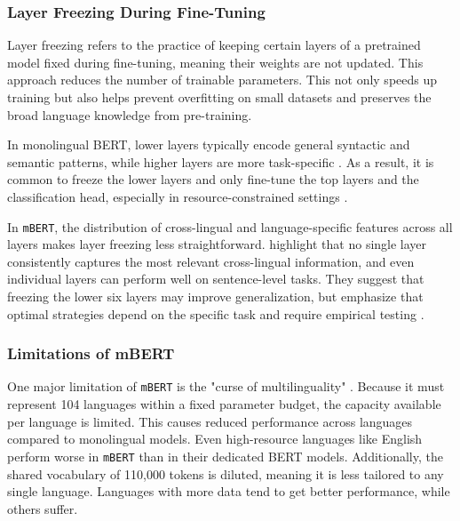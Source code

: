 \subsubsection{Layer Freezing During Fine-Tuning} \label{subsection:layer_freezing}
    Layer freezing refers to the practice of keeping certain layers of a pretrained model fixed during fine-tuning, meaning their weights are not updated. This approach reduces the number of trainable parameters. This not only speeds up training \parencite{sorrentiSelectiveFreezingEfficient2023} but also helps prevent overfitting on small datasets and preserves the broad language knowledge from pre-training.

    In monolingual BERT, lower layers typically encode general syntactic and semantic patterns, while higher layers are more task-specific \parencite{nadipalliLayerWiseEvolutionRepresentations2025}. As a result, it is common to freeze the lower layers and only fine-tune the top layers and the classification head, especially in resource-constrained settings \parencite{nadipalliLayerWiseEvolutionRepresentations2025}.

    In \texttt{mBERT}, the distribution of cross-lingual and language-specific features across all layers makes layer freezing less straightforward. \textcite{wuBetoBentzBecas2019} highlight that no single layer consistently captures the most relevant cross-lingual information, and even individual layers can perform well on sentence-level tasks. They suggest that freezing the lower six layers may improve generalization, but emphasize that optimal strategies depend on the specific task and require empirical testing \parencite{wuBetoBentzBecas2019}.

\subsubsection{Limitations of mBERT}
    One major limitation of \texttt{mBERT} is the "curse of multilinguality" \parencite{gurgurovMultilingualLargeLanguage2024}. Because it must represent 104 languages within a fixed parameter budget, the capacity available per language is limited. This causes reduced performance across languages compared to monolingual models. Even high-resource languages like English perform worse in \texttt{mBERT} than in their dedicated BERT models. Additionally, the shared vocabulary of 110,000 tokens is diluted, meaning it is less tailored to any single language. Languages with more data tend to get better performance, while others suffer.

